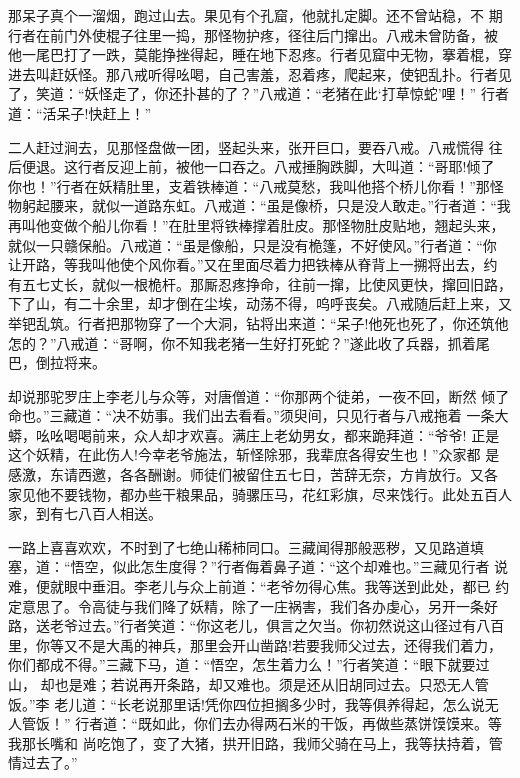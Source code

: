 那呆子真个一溜烟，跑过山去。果见有个孔窟，他就扎定脚。还不曾站稳，不
期行者在前门外使棍子往里一捣，那怪物护疼，径往后门撺出。八戒未曾防备，被
他一尾巴打了一跌，莫能挣挫得起，睡在地下忍疼。行者见窟中无物，搴着棍，穿
进去叫赶妖怪。那八戒听得吆喝，自己害羞，忍着疼，爬起来，使钯乱扑。行者见
了，笑道：“妖怪走了，你还扑甚的了？”八戒道：“老猪在此‘打草惊蛇’哩！”
行者道：“活呆子!快赶上！”

二人赶过涧去，见那怪盘做一团，竖起头来，张开巨口，要吞八戒。八戒慌得
往后便退。这行者反迎上前，被他一口吞之。八戒捶胸跌脚，大叫道：“哥耶!倾了
你也！”行者在妖精肚里，支着铁棒道：“八戒莫愁，我叫他搭个桥儿你看！”那怪
物躬起腰来，就似一道路东虹。八戒道：“虽是像桥，只是没人敢走。”行者道：“我
再叫他变做个船儿你看！”在肚里将铁棒撑着肚皮。那怪物肚皮贴地，翘起头来，
就似一只赣保船。八戒道：“虽是像船，只是没有桅篷，不好使风。”行者道：“你
让开路，等我叫他使个风你看。”又在里面尽着力把铁棒从脊背上一搠将出去，约
有五七丈长，就似一根桅杆。那厮忍疼挣命，往前一撺，比使风更快，撺回旧路，
下了山，有二十余里，却才倒在尘埃，动荡不得，呜呼丧矣。八戒随后赶上来，又
举钯乱筑。行者把那物穿了一个大洞，钻将出来道：“呆子!他死也死了，你还筑他
怎的？”八戒道：“哥啊，你不知我老猪一生好打死蛇？”遂此收了兵器，抓着尾
巴，倒拉将来。

却说那驼罗庄上李老儿与众等，对唐僧道：“你那两个徒弟，一夜不回，断然
倾了命也。”三藏道：“决不妨事。我们出去看看。”须臾间，只见行者与八戒拖着
一条大蟒，吆吆喝喝前来，众人却才欢喜。满庄上老幼男女，都来跪拜道：“爷爷!
正是这个妖精，在此伤人!今幸老爷施法，斩怪除邪，我辈庶各得安生也！”众家都
是感激，东请西邀，各各酬谢。师徒们被留住五七日，苦辞无奈，方肯放行。又各
家见他不要钱物，都办些干粮果品，骑骡压马，花红彩旗，尽来饯行。此处五百人
家，到有七八百人相送。

一路上喜喜欢欢，不时到了七绝山稀柿同口。三藏闻得那般恶秽，又见路道填
塞，道：“悟空，似此怎生度得？”行者侮着鼻子道：“这个却难也。”三藏见行者
说难，便就眼中垂泪。李老儿与众上前道：“老爷勿得心焦。我等送到此处，都已
约定意思了。令高徒与我们降了妖精，除了一庄祸害，我们各办虔心，另开一条好
路，送老爷过去。”行者笑道：“你这老儿，俱言之欠当。你初然说这山径过有八百
里，你等又不是大禹的神兵，那里会开山凿路!若要我师父过去，还得我们着力，
你们都成不得。”三藏下马，道：“悟空，怎生着力么！”行者笑道：“眼下就要过山，
却也是难；若说再开条路，却又难也。须是还从旧胡同过去。只恐无人管饭。”李
老儿道：“长老说那里话!凭你四位担搁多少时，我等俱养得起，怎么说无人管饭！”
行者道：“既如此，你们去办得两石米的干饭，再做些蒸饼馍馍来。等我那长嘴和
尚吃饱了，变了大猪，拱开旧路，我师父骑在马上，我等扶持着，管情过去了。”

